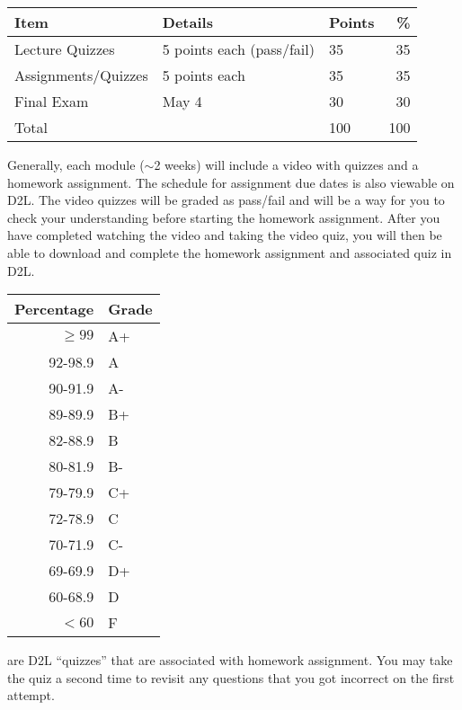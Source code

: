 \documentclass{tufte-handout}
\begin{document}
\begin{table}
\begin{tabular}{l l l r}
Item & Details & Points &  \% \\
\hline
Lecture Quizzes & 5 points each (pass/fail) & 35 & 35 \\
Assignments/Quizzes  &  5 points each & 35 & 35\\
Final Exam & May 4 & 30 & 30 \\
\hline
Total & & 100 & 100 
\end{tabular}
\end{table}







Generally, each module ($\sim$2 weeks) will include a video with quizzes and a homework assignment.  The schedule for assignment due dates is also viewable on D2L. The video quizzes will be graded as pass/fail and will be a way for you to check your understanding before starting the homework assignment. After you have completed watching the video and taking the video quiz, you will then be able to download and complete the homework assignment and associated quiz in D2L. 





\begin{margintable}
\begin{tabular}{rl}
Percentage & Grade \\
\hline 
$\ge99$ & A+ \\
92-98.9 & A \\
90-91.9 & A- \\
89-89.9 & B+ \\
82-88.9 & B \\
80-81.9 & B- \\
79-79.9 & C+ \\
72-78.9 & C \\
70-71.9 & C- \\
69-69.9 & D+ \\
60-68.9 & D \\
$<60$ & F \\
\hline
\end{tabular}
\end{margintable}



  are D2L ``quizzes'' that are associated with homework assignment. You may take the quiz a second time to revisit any questions that you got incorrect on the first attempt.
\end{document}
